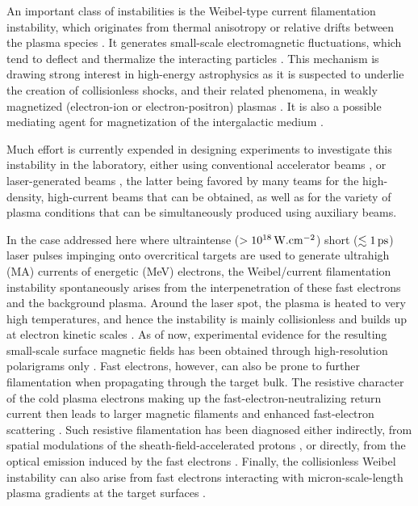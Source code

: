 \documentclass[aps,twocolumn,showpacs,superscriptaddress]{revtex4}
\begin{document}
An important class of instabilities is the Weibel-type current filamentation instability, which originates from thermal anisotropy \cite{PRL_Weibel_1959} or relative drifts between the plasma species \cite{POF_Fried_1959}. It generates small-scale electromagnetic fluctuations, which tend to deflect and thermalize the interacting particles \cite{POF_Davidson_1972, PRL_Lee_1973, APJ_Jaroschek_2004, PRL_Adam_2006}. This mechanism is drawing strong interest in high-energy astrophysics as it is suspected to underlie the creation of collisionless shocks, and their related phenomena, in weakly magnetized (electron-ion or electron-positron) plasmas \cite{RPP_Marcowith_2016}. It is also a possible mediating agent for magnetization of the intergalactic medium \cite{APJ_Schlickeiser_2003}.

Much effort is currently expended in designing experiments to investigate this instability in the laboratory, either using conventional accelerator beams \cite{PRL_Allen_2012}, or laser-generated beams \cite{PRL_Fox_2013,NP_Huntington_2015},
the latter being favored by many teams for the high-density, high-current beams that can be obtained, as well as for the variety of plasma conditions that can be simultaneously produced using auxiliary beams. 

In the case addressed here where ultraintense ($>10^{18}\,\rm W.cm^{-2}$) short ($\lesssim 1\,\rm ps$) laser pulses impinging onto overcritical targets are used to generate ultrahigh (MA) currents of energetic (MeV) electrons, the Weibel/current filamentation instability spontaneously arises from the interpenetration of these fast electrons and the background plasma. Around the laser spot, the plasma is heated to very high temperatures, and hence the instability is mainly collisionless and builds up at electron kinetic scales \cite{PRL_Adam_2006}. As of now, experimental evidence for the resulting small-scale surface magnetic fields has been obtained through high-resolution polarigrams only \cite{PNAS_Mondal_2012}. 
Fast electrons, however, can also be prone to further filamentation when propagating through the target bulk. The resistive character of the cold plasma electrons making up the fast-electron-neutralizing return current \cite{POP_Gremillet_2002} then leads to larger magnetic filaments \cite{JPP_Fiore_2010} and enhanced fast-electron scattering \cite{POP_Yang_2016}. Such resistive filamentation has been diagnosed either indirectly, from spatial modulations of the sheath-field-accelerated protons \cite{PRL_Fuchs_2003, PRL_MacLellan_2013}, or directly, from the optical emission induced by the fast electrons  \cite{PRL_Storm_2009}. Finally, the collisionless Weibel instability can also arise from fast electrons interacting with micron-scale-length plasma gradients at the target surfaces \cite{PRE_Wei_2004, PRL_Quinn_2012, PRL_Gode_2017, NJP_Scott_2017}.
\end{document}
